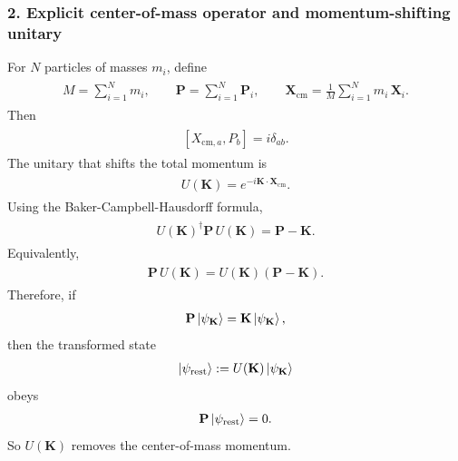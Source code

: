 \documentclass[../QFT_main.tex]{subfiles}
\begin{document}
\subsubsection*{2. Explicit center-of-mass operator and momentum-shifting unitary}
For $N$ particles of masses $m_i$, define
{\small\begin{align}
\begin{aligned}
    M=\sum_{i=1}^N m_i,\qquad \mathbf{P}=\sum_{i=1}^N \mathbf{P}_i,\qquad \mathbf{X}_{\text{cm}}=\frac{1}{M}\sum_{i=1}^N m_i\,\mathbf{X}_i.
\end{aligned}
\end{align}}
Then
{\small\begin{align}
\begin{aligned}
    [X_{\text{cm},a},P_b]=i\delta_{ab}.
\end{aligned}
\end{align}}
The unitary that shifts the total momentum is
{\small\begin{align}
\begin{aligned}
    U(\mathbf{K})=e^{-i\mathbf{K}\cdot \mathbf{X}_{\text{cm}}}.
\end{aligned}
\end{align}}
Using the Baker-Campbell-Hausdorff formula,
{\small\begin{align}
\begin{aligned}
    U(\mathbf{K})^\dagger\mathbf{P}\,U(\mathbf{K})=\mathbf{P}-\mathbf{K}.
\end{aligned}
\end{align}}
Equivalently,
{\small\begin{align}
\begin{aligned}
    \mathbf{P}\,U(\mathbf{K})=U(\mathbf{K})(\mathbf{P}-\mathbf{K}).
\end{aligned}
\end{align}}
Therefore, if
{\small\begin{align}
\begin{aligned}
    \mathbf{P}\ket{\psi_{\mathbf{K}}}=\mathbf{K}\ket{\psi_{\mathbf{K}}},
\end{aligned}
\end{align}}
then the transformed state
{\small\begin{align}
\begin{aligned}
    \ket{\psi_{\mathrm{rest}}}:=U(\mathbf{K})\ket{\psi_{\mathbf{K}}}
\end{aligned}
\end{align}}
obeys
{\small\begin{align}
\begin{aligned}
    \mathbf{P}\ket{\psi_{\mathrm{rest}}}=0.
\end{aligned}
\end{align}}
So $U(\mathbf{K})$ removes the center-of-mass momentum.
\end{document}

